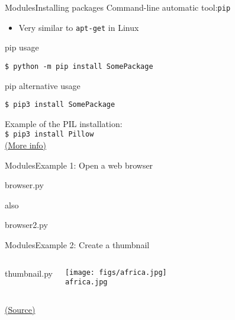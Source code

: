 \documentclass[10pt,compress]{beamer} %
\begin{document}
\begin{frame}[fragile]{Modules}{Installing packages}
	Command-line automatic tool:\texttt{pip} 
		\begin{itemize}
			\item Very similar to \texttt{apt-get} in Linux
		\end{itemize}

	\begin{block}{pip usage}
	\begin{verbatim}
$ python -m pip install SomePackage
\end{verbatim}
	\end{block}

	\begin{block}{pip alternative usage}
	\begin{verbatim}
$ pip3 install SomePackage
\end{verbatim}
	\end{block}
	Example of the PIL  installation:\\
	\texttt{\$ pip3 install Pillow}\\
    \href{http://recursospython.com/guias-y-manuales/instalacion-y-utilizacion-de-pip-en-windows-linux-y-os-x/}{(More info)}
\end{frame}

\begin{frame}{Modules}{Example 1: Open a web browser}
	\vspace{-0.2cm}
	\begin{block}{browser.py}
	\vspace{-0.2cm}
	
	\vspace{-0.2cm}
	\end{block}

    also 

	\begin{block}{browser2.py}
	\vspace{-0.2cm}
	
	\vspace{-0.2cm}
	\end{block}

\end{frame}

\begin{frame}[plain]{Modules}{Example 2: Create a thumbnail}
	\begin{columns}

		\vspace{-0.2cm}
		\begin{block}{thumbnail.py}
		\vspace{-0.2cm}
		
		\vspace{-0.2cm}
		\end{block}

		\vspace{-0.2cm}
		\centering \texttt{[image: figs/africa.jpg]}\\
	 	\texttt{africa.jpg}
	\end{columns}
		\vspace{-0.2cm}
	\centering \tiny{\href{http://www.pythonforbeginners.com/gui/how-to-use-pillow}{(Source)}}
\end{frame}
\end{document}
